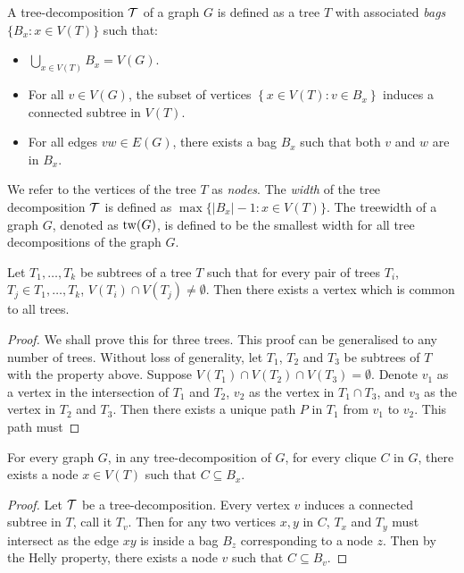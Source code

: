 \begin{definition}\label{def:tree-decomposition}
	A tree-decomposition \(\mathcal{T}\) of a graph \(G\) is defined as a tree \(T\) with associated \textit{bags} \(\lbrace B_x : x \in V(T) \rbrace\) such that:
	\begin{itemize}
		\item $\bigcup_{x \in V(T)} B_x = V(G)$.
		\item For all \(v \in V(G)\), the subset of vertices \(\left\lbrace x \in V(T): v \in B_x \right\rbrace\) induces a connected subtree in \(V(T)\).
		\item For all edges \(vw \in E(G)\), there exists a bag \(B_x\) such that both \(v\) and \(w\) are in \(B_x\).
	\end{itemize}
\end{definition}
We refer to the vertices of the tree \(T\) as \textit{nodes}.
The \textit{width} of the tree decomposition \(\mathcal{T}\) is defined as \(\max \lbrace |B_x| - 1 : x \in V(T) \rbrace\).
The treewidth of a graph \(G\), denoted as \(\operatorname{tw}(G)\), is defined to be the smallest width for all tree decompositions of the graph \(G\).

\begin{lemma}\label{lem:Helly}
	Let \(T_1, \ldots, T_k\) be subtrees of a tree \(T\) such that for every pair of trees $T_i$, $T_j \in T_1, \ldots, T_k$, $V(T_i) \cap V(T_j) \neq \emptyset$. Then there exists a vertex which is common to all trees.
\end{lemma}
\begin{proof}
	We shall prove this for three trees. This proof can be generalised to any number of trees. 
	Without loss of generality, let \(T_1\), \(T_2\) and \(T_3\) be subtrees of \(T\) with the property above. Suppose $V(T_1) \cap V(T_2) \cap V(T_3) = \emptyset$. Denote \(v_1\) as a vertex in the intersection of \(T_1\) and \(T_2\), \(v_2\) as the vertex in \(T_1 \cap T_3\), and \(v_3\) as the vertex in \(T_2\) and \(T_3\). Then there exists a unique path \(P\) in \(T_1\) from \(v_1\) to \(v_2\). This path must 
\end{proof}

\begin{lemma}\label{lem:clique}
	For every graph $G$, in any tree-decomposition of \(G\), for every clique \(C\) in \(G\), there exists a node \(x \in V(T)\) such that \(C \subseteq B_x\).
\end{lemma}

\begin{proof}
	Let \(\mathcal{T}\) be a tree-decomposition. Every vertex \(v\) induces a connected subtree in \(T\), call it \(T_v\). Then for any two vertices \(x, y\) in \(C\), \(T_x\) and \(T_y\) must intersect as the edge \(xy\) is inside a bag \(B_z\) corresponding to a node \(z\). Then by the Helly property, there exists a node \(v\) such that \(C \subseteq B_v\).
\end{proof}

